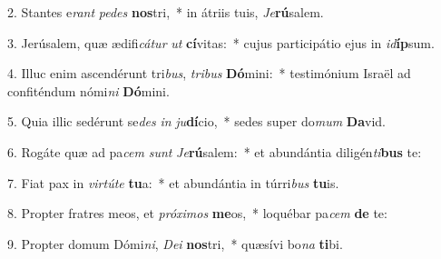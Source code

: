 2. Stantes e\textit{rant} \textit{pe}\textit{des} \textbf{nos}tri,~*  in átriis tuis, \textit{Je}\textbf{rú}salem.\

3. Jerúsalem, quæ ædifi\textit{cá}\textit{tur} \textit{ut} \textbf{cí}vitas:~*  cujus participátio ejus in \textit{id}\textbf{íp}sum.\

4. Illuc enim ascendérunt tri\textit{bus}, \textit{tri}\textit{bus} \textbf{Dó}mini:~*  testimónium Israël ad confiténdum nómi\textit{ni} \textbf{Dó}mini.\

5. Quia illic sedérunt se\textit{des} \textit{in} \textit{ju}\textbf{dí}cio,~*  sedes super do\textit{mum} \textbf{Da}vid.\

6. Rogáte quæ ad pa\textit{cem} \textit{sunt} \textit{Je}\textbf{rú}salem:~*  et abundántia diligén\textit{ti}\textbf{bus} te:\

7. Fiat pax in \textit{vir}\textit{tú}\textit{te} \textbf{tu}a:~*  et abundántia in túrri\textit{bus} \textbf{tu}is.\

8. Propter fratres meos, et \textit{pró}\textit{xi}\textit{mos} \textbf{me}os,~*  loquébar pa\textit{cem} \textbf{de} te:\

9. Propter domum Dómi\textit{ni}, \textit{De}\textit{i} \textbf{nos}tri,~*  quæsívi bo\textit{na} \textbf{ti}bi.\

